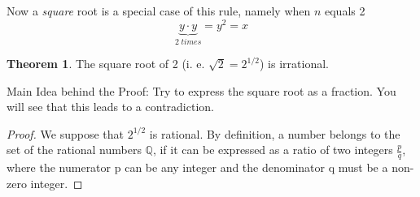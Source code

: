 \documentclass[11pt]{amsart}
\theoremstyle{definition}
\newtheorem{theorem}{Theorem}
\begin{document}
Now a \emph{square} root is a special case of this rule, namely when \(n\) equals 2
\begin{equation}
    \underbrace{y \cdot y}_{2 \; times} = y^{2} = x
\end{equation}

\begin{theorem}
The square root of 2 (i. e. \( \sqrt{2} = 2^{1/2}\)) is irrational.
\end{theorem}
Main Idea behind the Proof: Try to express the square root as a fraction. You will see that this leads to a contradiction.
\begin{proof}
We suppose that \(2^{1/2}\) is rational. By definition, a number belongs to the set of the rational numbers \(\mathbb{Q}\), if it can be expressed as a ratio of two integers  \(\frac{p}{q}\), where the numerator p can be any integer and the denominator q must be a non-zero integer.


\end{proof}
\end{document}
